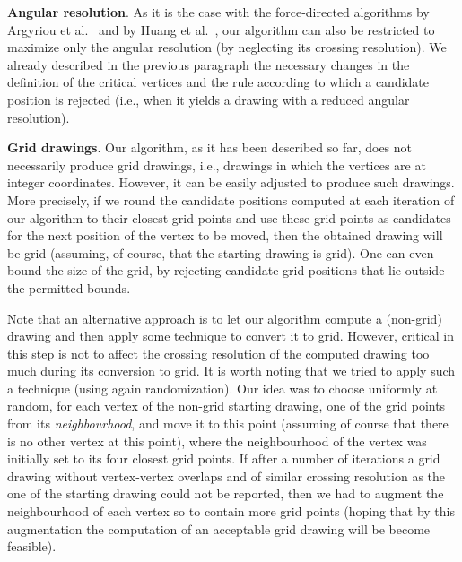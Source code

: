 \documentclass{comjnl}
\newcommand{\myparagraph}[1]{\medskip\noindent\textbf{#1}.}
\begin{document}
\myparagraph{Angular resolution}
%
As it is the case with the force-directed algorithms by Argyriou et al.~\cite{DBLP:journals/cj/ArgyriouBS13} and by Huang et al.~\cite{DBLP:journals/vlc/HuangEHL13}, our algorithm can also be restricted to maximize only the angular resolution (by neglecting its crossing resolution). We already described in the previous paragraph the necessary changes in the definition of the critical vertices and the rule according to which a candidate position is rejected (i.e., when it yields a drawing with a reduced angular resolution).

\myparagraph{Grid drawings}
%
Our algorithm, as it has been described so far, does not necessarily produce grid drawings, i.e., drawings in which the vertices are at integer coordinates. However, it can be easily adjusted to produce such drawings. More precisely, if we round the candidate positions computed at each iteration of our algorithm to their closest grid points and use these grid points as candidates for the next position of the vertex to be moved, then the obtained drawing will be grid (assuming, of course, that the starting drawing is grid). One can even bound the size of the grid, by rejecting candidate grid positions that lie outside the permitted bounds. 

Note that an alternative approach is to let our algorithm compute a (non-grid) drawing and then apply some technique to convert it to grid. However, critical in this step is not to affect the crossing resolution of the computed drawing too much during its conversion to grid. It is worth noting that we tried to apply such a technique (using again randomization). Our idea was to choose uniformly at random, for each vertex of the non-grid starting drawing, one of the grid points from its \emph{neighbourhood}, and move it to this point (assuming of course that there is no other vertex at this point), where the neighbourhood of the vertex was initially set to its four closest grid points. If after a number of iterations a grid drawing without vertex-vertex overlaps and of similar crossing resolution as the one of the starting drawing could not be reported, then we had to augment the neighbourhood of each vertex so to contain more grid points (hoping that by this augmentation the computation of an acceptable grid drawing will be become feasible). 
\end{document}
